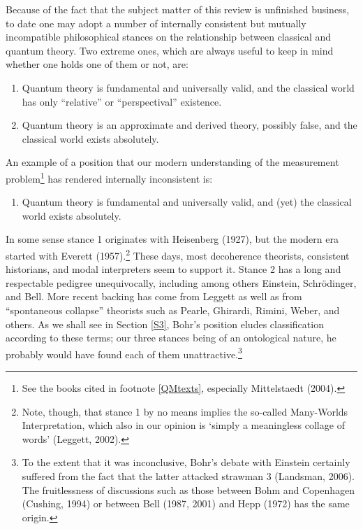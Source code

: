 \documentclass[12pt,titlepage]{article}
\begin{document}
Because of the fact that the subject matter of this review is unfinished business, to date one may adopt a number of internally consistent but mutually incompatible philosophical stances on the relationship between classical and quantum theory. Two extreme ones, which are always useful to keep in mind whether one holds one of them or not, are:
\begin{enumerate}
\item Quantum theory is fundamental and universally valid, and the classical world has 
only ``relative'' or ``perspectival'' existence.
\item Quantum theory is an approximate and derived theory, possibly false, and the classical world exists absolutely.
\end{enumerate}
An example of a position that our modern understanding of the measurement problem\footnote{See the books cited in footnote \ref{QMtexts}, 
especially Mittelstaedt (2004).}  has rendered internally inconsistent is: 
\begin{enumerate}[resume]
  \item Quantum theory is fundamental and universally valid, and (yet) the classical world exists absolutely.
\end{enumerate}

\noindent
In some sense stance 1 originates with Heisenberg (1927), but the modern era started with
Everett (1957).\footnote{\label{MWM} Note, though,  that stance 1 by no means implies the so-called  Many-Worlds Interpretation, which also in our opinion is `simply a meaningless collage of words' (Leggett, 2002).} These days, most decoherence theorists, consistent historians,
and modal interpreters seem to support it. Stance 2 has a long and respectable pedigree unequivocally, including among others Einstein, Schr\"{o}dinger, and Bell. More recent backing has come from  Leggett as well as from ``spontaneous collapse'' theorists such as Pearle, Ghirardi, Rimini, Weber, and others.
As we shall see in Section \ref{S3},  Bohr's position eludes classification according to these terms; our three stances being of an ontological nature, he probably would have found each of them unattractive.\footnote{To the extent that it was inconclusive, Bohr's debate with Einstein certainly suffered from the fact that the latter attacked strawman 3 (Landsman, 2006).
The fruitlessness of discussions such as those between Bohm and Copenhagen (Cushing, 1994) or between  Bell (1987, 2001) and Hepp (1972) has the same origin.} 
\end{document}
